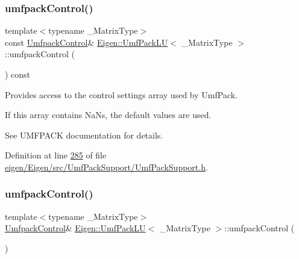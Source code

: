 \mbox{\label{class_eigen_1_1_umf_pack_l_u_ae83d178202f3d44c1789c1c93842bf2e}} 
\subsubsection{\texorpdfstring{umfpack\+Control()}{umfpackControl()}\hspace{0.1cm}{\footnotesize\ttfamily [2/4]}}
{\footnotesize\ttfamily template$<$typename \+\_\+\+Matrix\+Type$>$ \\
const \hyperlink{group___core___module}{Umfpack\+Control}\& \hyperlink{class_eigen_1_1_umf_pack_l_u}{Eigen\+::\+Umf\+Pack\+LU}$<$ \+\_\+\+Matrix\+Type $>$\+::umfpack\+Control (\begin{DoxyParamCaption}{ }\end{DoxyParamCaption}) const\hspace{0.3cm}{\ttfamily [inline]}}

Provides access to the control settings array used by Umf\+Pack.

If this array contains NaN\textquotesingle{}s, the default values are used.

See U\+M\+F\+P\+A\+CK documentation for details. 

Definition at line \hyperlink{eigen_2_eigen_2src_2_umf_pack_support_2_umf_pack_support_8h_source_l00285}{285} of file \hyperlink{eigen_2_eigen_2src_2_umf_pack_support_2_umf_pack_support_8h_source}{eigen/\+Eigen/src/\+Umf\+Pack\+Support/\+Umf\+Pack\+Support.\+h}.

\mbox{\label{class_eigen_1_1_umf_pack_l_u_a679bd267a0407d4ca985d97f0b864101}} 
\subsubsection{\texorpdfstring{umfpack\+Control()}{umfpackControl()}\hspace{0.1cm}{\footnotesize\ttfamily [3/4]}}
{\footnotesize\ttfamily template$<$typename \+\_\+\+Matrix\+Type$>$ \\
\hyperlink{group___core___module}{Umfpack\+Control}\& \hyperlink{class_eigen_1_1_umf_pack_l_u}{Eigen\+::\+Umf\+Pack\+LU}$<$ \+\_\+\+Matrix\+Type $>$\+::umfpack\+Control (\begin{DoxyParamCaption}{ }\end{DoxyParamCaption})\hspace{0.3cm}{\ttfamily [inline]}}

